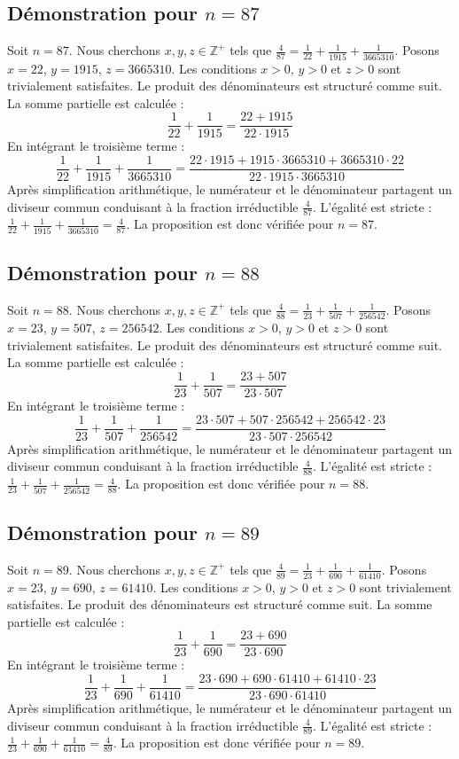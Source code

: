 \documentclass[11pt,a4paper]{article}
\begin{document}
\subsection{Démonstration pour $n = 87$}
Soit $n = 87$. Nous cherchons $x, y, z \in \mathbb{Z}^{+}$ tels que $\frac{4}{87} = \frac{1}{22} + \frac{1}{1915} + \frac{1}{3665310}$.
Posons $x = 22$, $y = 1915$, $z = 3665310$.
Les conditions $x > 0$, $y > 0$ et $z > 0$ sont trivialement satisfaites.
Le produit des dénominateurs est structuré comme suit. La somme partielle est calculée :
$$ \frac{1}{22} + \frac{1}{1915} = \frac{22+1915}{22 \cdot 1915} $$
En intégrant le troisième terme :
$$ \frac{1}{22} + \frac{1}{1915} + \frac{1}{3665310} = \frac{22 \cdot 1915 + 1915 \cdot 3665310 + 3665310 \cdot 22}{22 \cdot 1915 \cdot 3665310} $$
Après simplification arithmétique, le numérateur et le dénominateur partagent un diviseur commun conduisant à la fraction irréductible $\frac{4}{87}$.
L'égalité est stricte : $\frac{1}{22} + \frac{1}{1915} + \frac{1}{3665310} = \frac{4}{87}$.
La proposition est donc vérifiée pour $n = 87$.
\subsection{Démonstration pour $n = 88$}
Soit $n = 88$. Nous cherchons $x, y, z \in \mathbb{Z}^{+}$ tels que $\frac{4}{88} = \frac{1}{23} + \frac{1}{507} + \frac{1}{256542}$.
Posons $x = 23$, $y = 507$, $z = 256542$.
Les conditions $x > 0$, $y > 0$ et $z > 0$ sont trivialement satisfaites.
Le produit des dénominateurs est structuré comme suit. La somme partielle est calculée :
$$ \frac{1}{23} + \frac{1}{507} = \frac{23+507}{23 \cdot 507} $$
En intégrant le troisième terme :
$$ \frac{1}{23} + \frac{1}{507} + \frac{1}{256542} = \frac{23 \cdot 507 + 507 \cdot 256542 + 256542 \cdot 23}{23 \cdot 507 \cdot 256542} $$
Après simplification arithmétique, le numérateur et le dénominateur partagent un diviseur commun conduisant à la fraction irréductible $\frac{4}{88}$.
L'égalité est stricte : $\frac{1}{23} + \frac{1}{507} + \frac{1}{256542} = \frac{4}{88}$.
La proposition est donc vérifiée pour $n = 88$.
\subsection{Démonstration pour $n = 89$}
Soit $n = 89$. Nous cherchons $x, y, z \in \mathbb{Z}^{+}$ tels que $\frac{4}{89} = \frac{1}{23} + \frac{1}{690} + \frac{1}{61410}$.
Posons $x = 23$, $y = 690$, $z = 61410$.
Les conditions $x > 0$, $y > 0$ et $z > 0$ sont trivialement satisfaites.
Le produit des dénominateurs est structuré comme suit. La somme partielle est calculée :
$$ \frac{1}{23} + \frac{1}{690} = \frac{23+690}{23 \cdot 690} $$
En intégrant le troisième terme :
$$ \frac{1}{23} + \frac{1}{690} + \frac{1}{61410} = \frac{23 \cdot 690 + 690 \cdot 61410 + 61410 \cdot 23}{23 \cdot 690 \cdot 61410} $$
Après simplification arithmétique, le numérateur et le dénominateur partagent un diviseur commun conduisant à la fraction irréductible $\frac{4}{89}$.
L'égalité est stricte : $\frac{1}{23} + \frac{1}{690} + \frac{1}{61410} = \frac{4}{89}$.
La proposition est donc vérifiée pour $n = 89$.
\end{document}
